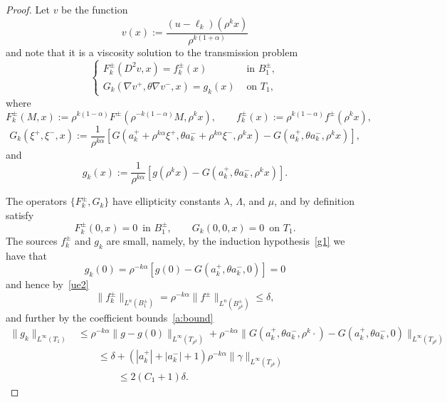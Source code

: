 \documentclass[letter,11pt]{amsart}
\theoremstyle{definition}
\numberwithin{equation}{section}
\begin{document}
\begin{proof}
Let $v$ be the function
\[
v(x) := \frac{(u-\ell_k)(\rho^{k}x)}{\rho^{k(1+\alpha)}}
\]
and note that it is a viscosity solution to the transmission problem
\begin{equation}
\label{k0}
\begin{cases}
F^{\pm}_k(D^2 v, x) = f_k^{\pm}(x) & \text{ in } B_1^{\pm},\\
G_k(\nabla v^{+}, \theta \nabla v^{-}, x) = g_k(x) & \text{ on } T_1,
\end{cases}
\end{equation}
where
\[
F_k^{\pm}(M, x) := \rho^{k(1-\alpha)} F^{\pm}(\rho^{- k(1-\alpha)} M, \rho^k x),
\qquad f_k^{\pm}(x) := \rho^{k(1-\alpha)} f^{\pm}(\rho^{k} x),
\]
\[
G_k (\xi^{+}, \xi^{-}, x) := \frac{1}{\rho^{k \alpha}} \left[
G(a_k^{+} + \rho^{k\alpha} \xi^{+}, \theta a_k^{-} + \rho^{k\alpha} \xi^{-}, \rho^{k} x)
- G(a_k^{+}, \theta a_k^{-}, \rho^{k} x)
\right],
\]
and
\[
g_k(x) := \frac{1}{\rho^{k \alpha}} \left[g(\rho^{k} x)
- G(a_k^{+}, \theta a_k^{-}, \rho^{k} x)
\right].
\]

\medskip

The operators $\{F_{k}^{\pm}, G_k\}$ have ellipticity constants $\lambda$, $\Lambda$, and $\mu$, and by definition satisfy
\begin{equation}
\label{k1}
F_k^{\pm}(0, x) = 0 \, \text{ in } B_1^{\pm}, \qquad G_k(0,0,x) = 0 \, \text{ on } T_1.
\end{equation}
The sources $f^{\pm}_{k}$ and $g_k$ are small, namely, by the induction hypothesis~\eqref{g1} we have that
\begin{equation}
\label{k2}
g_k(0) =
\rho^{-k \alpha}
\left[g(0)
- G(a_k^{+}, \theta a_k^{-}, 0)
\right]
= 0
\end{equation}
and hence by~\eqref{ue2}
\begin{equation}
\label{k3}
\|f_k^{\pm}\|_{L^n(B_1^{\pm})} = \rho^{-k\alpha} \|f^{\pm}\|_{L^{n}(B^{\pm}_{\rho^{k}})} \leq \delta,
\end{equation}
and further by the coefficient bounds~\eqref{a:bound}
\begin{equation}
\label{k4}
\begin{split}
 \|g_k\|_{L^{\infty}(T_1)} &\leq \rho^{-k\alpha} \|g - g(0)\|_{L^{\infty}(T_{\rho^{k}})} 
 + \rho^{-k \alpha} \| G(a_k^{+}, \theta a_k^{-}, \rho^{k} \cdot) - G(a_k^{+}, \theta a_k^{-}, 0)\|_{L^{\infty}(T_{\rho^{k}})}\\
& \qquad \leq \delta + (|a_k^{+}| + |a_k^{-}| + 1) \rho^{-k \alpha} \|\gamma\|_{L^{\infty}(T_{\rho^{k}})}\\
&  \qquad \qquad \leq 2 (C_1 +1 ) \delta.
 \end{split}
\end{equation}


\end{proof}
\end{document}
